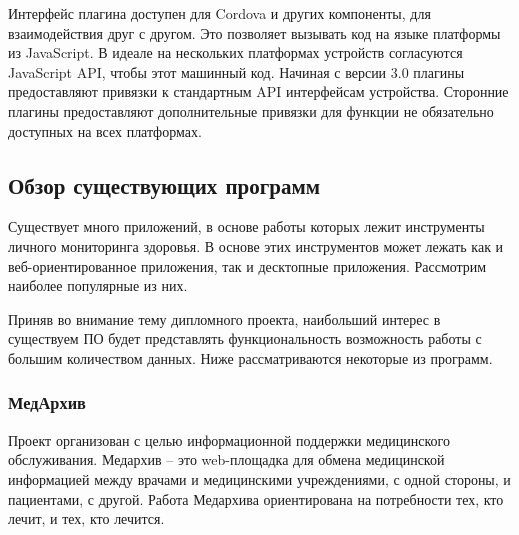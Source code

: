 Интерфейс плагина доступен для Cordova и других компоненты, для взаимодействия друг с другом. Это позволяет вызывать код на языке платформы из JavaScript. В идеале на нескольких платформах устройств согласуются JavaScript API, чтобы этот машинный код. Начиная с версии 3.0 плагины предоставляют привязки к стандартным API интерфейсам устройства. Сторонние плагины предоставляют дополнительные привязки для функции не обязательно доступных на всех платформах.


\subsection{Обзор существующих программ} %
\label{sub:domain:existing_programs}
Существует много приложений, в основе работы которых лежит инструменты личного мониторинга здоровья. В основе этих инструментов может лежать как и веб-ориентированное приложения, так и десктопные приложения. Рассмотрим наиболее популярные из них.

Приняв во внимание тему дипломного проекта, наибольший интерес в существуем ПО будет представлять функциональность возможность работы с большим количеством данных.
Ниже рассматриваются некоторые из программ.

\subsubsection{МедАрхив}

Проект организован с целью информационной поддержки медицинского обслуживания. Медархив -- это web-площадка для обмена медицинской информацией между врачами и медицинскими учреждениями, с одной стороны, и пациентами, с другой. Работа Медархива ориентирована на потребности тех, кто лечит, и тех, кто лечится.

